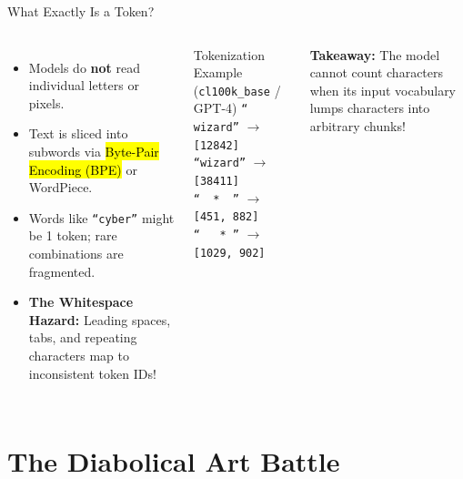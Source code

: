 \documentclass[aspectratio=169,11pt,xcolor={table,dvipsnames}]{beamer}
\begin{document}
\begin{frame}{What Exactly Is a Token?}
  \begin{columns}[T]
      \begin{itemize}
        \item Models do \textbf{not} read individual letters or pixels.
        \item Text is sliced into subwords via \hl{Byte-Pair Encoding (BPE)} or WordPiece.
        \item Words like \texttt{``cyber''} might be 1 token; rare combinations are fragmented.
        \item \textbf{The Whitespace Hazard:} Leading spaces, tabs, and repeating characters map to inconsistent token IDs!
      \end{itemize}

      \begin{exampleblock}{Tokenization Example (\texttt{cl100k\_base} / GPT-4)}
        \small
        \texttt{`` wizard''} $\rightarrow$ \texttt{[12842]} \\
        \texttt{``wizard''} $\rightarrow$ \texttt{[38411]} \\
        \texttt{``\ \ *\ \ ''} $\rightarrow$ \texttt{[451, 882]} \\
        \texttt{``\ \ \ *\ ''} $\rightarrow$ \texttt{[1029, 902]}
      \end{exampleblock}
      \vspace{0.2cm}
      \footnotesize\textcolor{accentamber}{\textbf{Takeaway:}} The model cannot count characters when its input vocabulary lumps characters into arbitrary chunks!
  \end{columns}
\end{frame}

\section{The Diabolical Art Battle}
\end{document}
